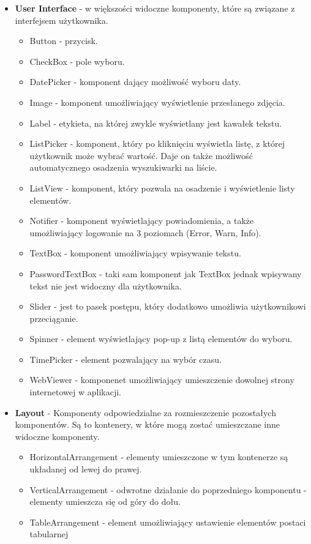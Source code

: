\begin{itemize}

\item \textbf{User Interface} - w większości widoczne komponenty, które są związane z interfejsem użytkownika.
\begin{itemize}
\item Button - przycisk.
\item CheckBox - pole wyboru.
\item DatePicker - komponent dający możliwość wyboru daty.
\item Image - komponent umożliwiający wyświetlenie przesłanego zdjęcia.
\item Label - etykieta, na której zwykle wyświetlany jest kawałek tekstu.
\item ListPicker - komponent, który po kliknięciu wyświetla listę, z której użytkownik może wybrać wartość. Daje on także możliwość automatycznego osadzenia wyszukiwarki na liście.
\item ListView - komponent, który pozwala na osadzenie i wyświetlenie listy elementów.
\item Notifier - komponent wyświetlający powiadomienia, a także umożliwiający logowanie na 3 poziomach (Error, Warn, Info).
\item TextBox - komponent umożliwiający wpisywanie tekstu.
\item PasswordTextBox - taki sam komponent jak TextBox jednak wpisywany tekst nie jest widoczny dla użytkownika.
\item Slider - jest to pasek postępu, który dodatkowo umożliwia użytkownikowi przeciąganie.
\item Spinner - element wyświetlający pop-up z listą elementów do wyboru.
\item TimePicker - element pozwalający na wybór czasu.
\item WebViewer - komponenet umożliwiający umieszczenie dowolnej strony internetowej w aplikacji.
\end{itemize}

\item \textbf{Layout} - Komponenty odpowiedzialne za rozmieszczenie pozostałych komponentów. Są to kontenery, w które mogą zostać umieszczane inne widoczne komponenty.
\begin{itemize}
\item HorizontalArrangement - elementy umieszczone w tym kontenerze są układanej od lewej do prawej.
\item VerticalArrangement - odwrotne działanie do poprzedniego komponentu - elementy umieszcza się od góry do dołu.
\item TableArrangement - element umożliwiający ustawienie elementów postaci tabularnej
\end{itemize}



\end{itemize}
